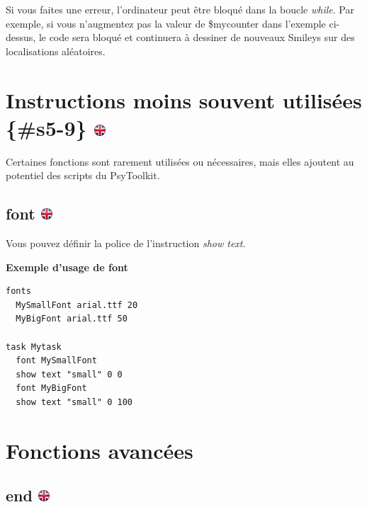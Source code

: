 \documentclass[
]{book}
\begin{document}
Si vous faites une erreur, l'ordinateur peut être bloqué dans la boucle \emph{while}. Par exemple, si vous n'augmentez pas la valeur de \$mycounter dans l'exemple ci-dessus, le code sera bloqué et continuera à dessiner de nouveaux Smileys sur des localisations aléatoires.

\hypertarget{instructions-moins-souvent-utilisuxe9es-s5-9}{%
\section[Instructions moins souvent utilisées \{\#s5-9\} ]{\texorpdfstring{Instructions moins souvent utilisées \{\#s5-9\} \href{https://www.psytoolkit.org/doc3.4.0/syntax.html\#_less_often_used_instructions}{\protect\includegraphics{img/ukflag.png}}}{Instructions moins souvent utilisées \{\#s5-9\} }}\label{instructions-moins-souvent-utilisuxe9es-s5-9}}

Certaines fonctions sont rarement utilisées ou nécessaires, mais elles ajoutent au potentiel des scripts du PsyToolkit.

\hypertarget{font}{%
\subsection[font ]{\texorpdfstring{font \href{https://www.psytoolkit.org/doc3.4.0/syntax.html\#font}{\protect\includegraphics{img/ukflag.png}}}{font }}\label{font}}

Vous pouvez définir la police de l'instruction \emph{show text}.

\textbf{Exemple d'usage de font}

\begin{verbatim}
fonts
  MySmallFont arial.ttf 20
  MyBigFont arial.ttf 50

task Mytask
  font MySmallFont
  show text "small" 0 0
  font MyBigFont
  show text "small" 0 100
\end{verbatim}

\hypertarget{s5-10}{%
\section{Fonctions avancées}\label{s5-10}}

\hypertarget{end}{%
\subsection[end ]{\texorpdfstring{end \href{https://www.psytoolkit.org/doc3.4.0/syntax.html\#task-end}{\protect\includegraphics{img/ukflag.png}}}{end }}\label{end}}
\end{document}
